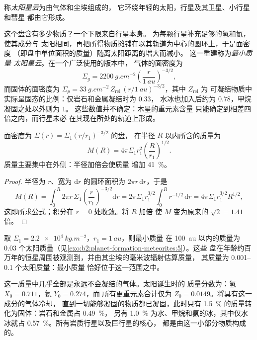\begin{definition}[太阳星云]\label{def:b2:planet-formation-meteorites:nebula}
称\emph{太阳星云}为由气体和尘埃组成的，
它环绕年轻的太阳，行星及其卫星、小行星和彗星
都由它形成。
\end{definition}

这个盘含有多少物质？一个下限来自行星本身。
为每颗行星补充足够的氢和氦，使其成分与
太阳相同，再把所得物质摊铺在以其轨道为中心的圆环上，于是面密度
（即盘中单位面积的质量）随离太阳距离的增大而减小。
这一重建称为\emph{最小质量
太阳星云}。在一个广泛使用的版本中，
气体的面密度为
\[
  \Sigma_g = \qty{2200}{g.cm^{-2}}\left(\frac{r}{\qty{1}{au}}\right)^{-3/2},
\]
而固体的面密度为 $\Sigma_p = \qty{33}{g.cm^{-2}}\,Z_{\mathrm{rel}}\,
(r/\qty{1}{au})^{-3/2}$，其中 $Z_{\mathrm{rel}}$ 为
可凝结物质中实际呈固态的比例：仅岩石和金属凝结时为 $0.33$，
水冰也加入后约为 $0.78$，甲烷凝固之处以外则为 $1$。
这些数值并不确定：木星的重元素含量
只能确定到相差四倍之内，而行星未必
在其现在所处的轨道上形成。

\begin{proposition}[盘的质量]\label{prop:b2:planet-formation-meteorites:disc-mass}
面密度为 $\Sigma(r) = \Sigma_1 (r/r_1)^{-3/2}$ 的盘，
在半径 $R$ 以内所含的质量为
\[
  M(R) = 4\pi\Sigma_1 r_1^2 \left(\frac{R}{r_1}\right)^{1/2}.
\]
质量主要集中在外侧：半径加倍会使质量
增加 \qty{41}{\percent}。
\end{proposition}

\begin{proof}
半径为 $r$、宽为 $\mathrm dr$ 的圆环面积为 $2\pi r\,\mathrm dr$，于是
\[
  M(R) = \int_0^R 2\pi r\,\Sigma_1 \left(\frac{r}{r_1}\right)^{-3/2}\mathrm dr
       = 2\pi\Sigma_1 r_1^{3/2}\int_0^R r^{-1/2}\,\mathrm dr
       = 4\pi\Sigma_1 r_1^{3/2} R^{1/2},
\]
这即所求公式；积分在 $r = 0$ 处收敛。将 $R$ 加倍
使 $M$ 变为原来的 $\sqrt 2 = 1.41$ 倍。
\end{proof}

取 $\Sigma_1 = \qty{2.2e4}{kg.m^{-2}}$，$r_1 = \qty{1}{au}$，则最小质量
在 \qty{100}{au} 以内的质量为 $0.03$ 个太阳质量（见\cref{exo:b2:planet-formation-meteorites:5}）。这些
盘在年龄约百万年的恒星周围被观测到，并由其尘埃的毫米波辐射估算质量，
其质量为 \numrange{0.001}{0.1} 个太阳质量：最小质量
恰好位于这一范围之中。

这一质量中几乎全部是永远不会凝结的气体。太阳诞生时的
质量分数为：氢 $X_0 = 0.711$，氦 $Y_0 = 0.274$，而
所有更重元素合计仅为 $Z_0 = 0.0149$。将具有这一成分的气体冷却，
直到一切能够凝固的物质都已凝固，此时只有
\qty{1.5}{\percent} 的质量转化为固体：岩石和金属占 \qty{0.49}{\percent}，
另有 \qty{1.0}{\percent} 为水、甲烷和氨的冰，其中仅水冰就占
\qty{0.57}{\percent}。所有岩质行星以及巨行星的核心，
都是由这一小部分物质构成的。

